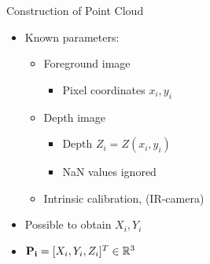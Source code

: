 
\begin{frame}{Construction of Point Cloud}

	\begin{itemize}
	\item Known parameters:
	\begin{itemize}
	\item Foreground image
	\begin{itemize}
		\item Pixel coordinates $x_i,y_i$
	\end{itemize}
	\item Depth image
	\begin{itemize}
		\item Depth $Z_i = Z(x_i,y_i)$ 
		\item NaN values ignored
	\end{itemize}
	\item Intrinsic calibration, (IR-camera)
	\end{itemize}
	\item Possible to obtain $X_i,Y_i$
	\item ${\bf P_i} = [X_i, Y_i, Z_i]^T \in \mathbb{R}^3$

	\end{itemize}
\end{frame}
